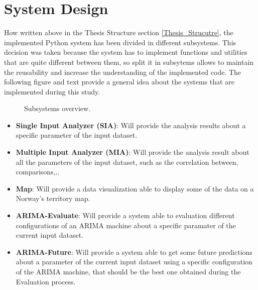 \newpage

\section{System Design}
\label{System_Design}
How written above in the Thesis Structure section \ref{Thesis_Strucutre}, the implemented Python system has been divided in different subsystems. This decision was taken because the system has to implement functions and utilities that are quite different between them, so split it in subsytems allows to maintain the reusability and increase the understanding of the implemented code.
The following figure and text provide a general idea about the systems that are implemented during this study.

\begin{figure}[h]
    \caption[Subsystems overview]{Subsystems overview.}
    \label{fig: Subsystems_Overview}
\end{figure}

\vspace{-5mm}
\begin{itemize}
 \item \textbf{Single Input Analyzer (SIA)}: Will provide the analysis results about a specific parameter of the input dataset.
 \item \textbf{Multiple Input Analyzer (MIA)}: Will provide the analysis result about all the parameters of the input dataset, such as the correlation between, comparisons,.. 
 \item \textbf{Map}: Will provide a data visualization able to display some of the data on a Norway's territory map.
 \item \textbf{ARIMA-Evaluate}: Will provide a system able to evaluation different configurations of an ARIMA machine about a specific paramater of the current input dataset.
 \item \textbf{ARIMA-Future}: Will provide a system able to get some future predictions about a parameter of the current input dataset using a specific configuration of the ARIMA machine, that should be the best one obtained during the Evaluation process.
\end{itemize} 



